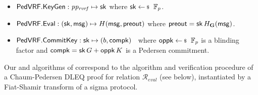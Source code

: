 \begin{itemize}
	\item ${\mathsf{PedVRF}}.{\mathsf{KeyGen}}: \mathit{pp_{\mathit{rvrf}}} \mapsto \mathsf{sk}$  where $\sk \leftsample \F_p$. %
	\item ${\mathsf{PedVRF}}.{\mathsf{Eval}} : (\mathsf{sk},\mathsf{msg}) \mapsto H(\mathsf{msg}, {\mathsf{preout}})$ where ${\mathsf{preout}} = \mathsf{sk} \, H_{{\mathbf{G}}}(\mathsf{msg})$.


	\item ${\mathsf{PedVRF}}.{\mathsf{CommitKey}}: \mathsf{sk} \mapsto (b, \mathsf{compk})$ \,
	where  $\openpk \leftsample \F_p$ is a blinding factor
	and $\mathsf{compk} = \mathsf{sk} \, G + \mathsf{oppk} \, K$ is a Pedersen commitment.
\end{itemize}

Our \Sign and \Verify algorithms of \PedVRF correspond to
the \Prove algorithm and verification procedure of a Chaum-Pedersen DLEQ proof
for relation $\mathcal{R}_{eval}$ (see below),
instantiated by a Fiat-Shamir transform of a sigma protocol.





